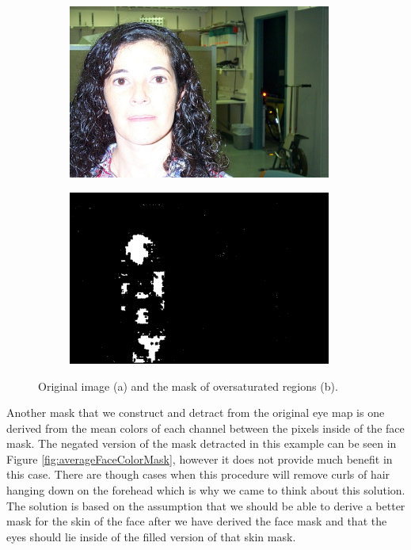 \begin{figure}[H]
\centering

\begin{subfigure}{.33\textwidth}
  \centering
  \includegraphics[width=0.95\textwidth]{img/fd2/overSaturated_input.jpg}
  \caption{}
\end{subfigure}%
\begin{subfigure}{.33\textwidth}
  \centering
  \includegraphics[width=0.95\textwidth]{img/fd2/overSaturated.png}
  \caption{}
\end{subfigure}%

\caption{Original image (a) and the mask of oversaturated regions (b).}
\label{fig:overSaturated}
\end{figure}

Another mask that we construct and detract from the original eye map is one derived from the mean colors of each channel between the pixels inside of the face mask. The negated version of the mask detracted in this example can be seen in Figure \ref{fig:averageFaceColorMask}, however it does not provide much benefit in this case. There are though cases when this procedure will remove curls of hair hanging down on the forehead which is why we came to think about this solution. The solution is based on the assumption that we should be able to derive a better mask for the skin of the face after we have derived the face mask and that the eyes should lie inside of the filled version of that skin mask.

